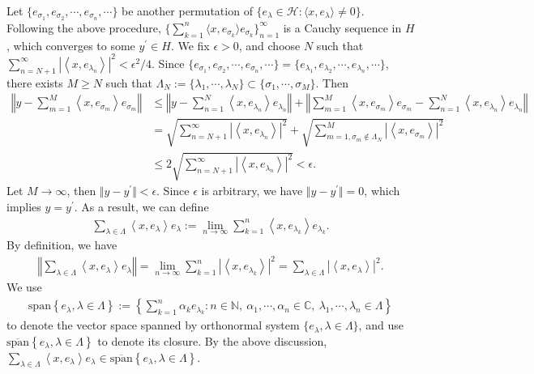 \documentclass{article}
\begin{document}
Let $\{e_{\sigma_1},e_{\sigma_2},\cdots,e_{\sigma_n},\cdots\}$ be another permutation of $\{e_\lambda\in\mathscr{H}:\langle x,e_\lambda\rangle\neq 0\}$. Following the above procedure, $\{\sum_{k=1}^n\langle x,e_{\sigma_k}\rangle e_{\sigma_k}\}_{n=1}^\infty$ is a Cauchy sequence in $H$, which converges to some $y^\prime\in H$. We fix $\epsilon >0$, and choose $N$ such that $\sum_{n=N+1}^\infty\left\vert\left\langle x,e_{\lambda_n}\right\rangle\right\vert^2 < \epsilon^2/4$. Since $\{e_{\sigma_1},e_{\sigma_2},\cdots,e_{\sigma_n},\cdots\}=\{e_{\lambda_1},e_{\lambda_2},\cdots,e_{\lambda_n},\cdots\}$, there exists $M\geq N$ such that $\Lambda_N:=\{\lambda_1,\cdots,\lambda_N\}\subset\{\sigma_1,\cdots,\sigma_M\}$. Then
\begin{align*}
	\left\Vert y - \sum_{m=1}^M\left\langle x,e_{\sigma_m}\right\rangle e_{\sigma_m}\right\Vert &\leq \left\Vert y - \sum_{n=1}^N\left\langle x,e_{\lambda_n}\right\rangle e_{\lambda_n}\right\Vert + \left\Vert\sum_{m=1}^M\left\langle x,e_{\sigma_m}\right\rangle e_{\sigma_m} - \sum_{n=1}^N\left\langle x,e_{\lambda_n}\right\rangle e_{\lambda_n}\right\Vert\\
	&= \sqrt{\sum_{n=N+1}^\infty\left\vert\left\langle x,e_{\lambda_n}\right\rangle\right\vert^2} + \sqrt{\sum_{m=1,\sigma_m\notin\Lambda_N}^M\left\vert\left\langle x,e_{\sigma_m}\right\rangle\right\vert^2}\\
	&\leq 2\sqrt{\sum_{n=N+1}^\infty\left\vert\left\langle x,e_{\lambda_n}\right\rangle\right\vert^2} < \epsilon.
\end{align*}
Let $M\to\infty$, then $\Vert y-y^\prime\Vert < \epsilon$. Since $\epsilon$ is arbitrary, we have $\Vert y-y^\prime\Vert = 0$, which implies $y=y^\prime$. As a result, we can define
\begin{align*}
	\sum_{\lambda\in\Lambda}\left\langle x,e_\lambda\right\rangle e_\lambda := \lim_{n\to\infty}\sum_{k=1}^n \left\langle x,e_{\lambda_k}\right\rangle e_{\lambda_k}.
\end{align*}
By definition, we have
\begin{align*}
	\left\Vert\sum_{\lambda\in\Lambda}\left\langle x,e_\lambda\right\rangle e_\lambda\right\Vert = \lim_{n\to\infty}\sum_{k=1}^n \left\vert\left\langle x,e_{\lambda_k}\right\rangle\right\vert^2 = \sum_{\lambda\in\Lambda}\left\vert\left\langle x,e_{\lambda}\right\rangle\right\vert^2.
\end{align*}
We use
\begin{align*}
	\mathrm{span}\left\{e_\lambda,\lambda\in\Lambda\right\} := \left\{\sum_{k=1}^n \alpha_k e_{\lambda_k}:n\in\mathbb{N},\ \alpha_1,\cdots,\alpha_n\in\mathbb{C},\ \lambda_1,\cdots,\lambda_n\in\Lambda\right\}
\end{align*}
to denote the vector space spanned by orthonormal system $\{e_\lambda,\lambda\in\Lambda\}$, and use $\overline{\mathrm{span}}\left\{e_\lambda,\lambda\in\Lambda\right\}$ to denote its closure. By the above discussion, $\sum_{\lambda\in\Lambda}\left\langle x,e_\lambda\right\rangle e_\lambda\in\overline{\mathrm{span}}\left\{e_\lambda,\lambda\in\Lambda\right\}$.
\end{document}
